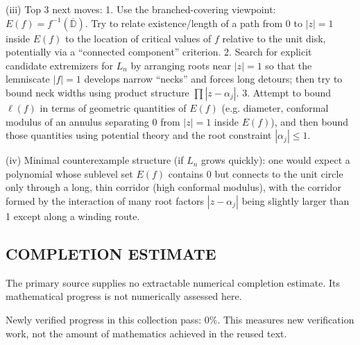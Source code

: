 (iii) Top 3 next moves:
1. Use the branched-covering viewpoint: \(E(f)=f^{-1}(\overline{\mathbb{D}})\). Try to relate existence/length of a path from \(0\) to \(|z|=1\) inside \(E(f)\) to the location of critical values of \(f\) relative to the unit disk, potentially via a ``connected component'' criterion.
2. Search for explicit candidate extremizers for \(L_n\) by arranging roots near \(|z|=1\) so that the lemniscate \(|f|=1\) develops narrow ``necks'' and forces long detours; then try to bound neck widths using product structure \(\prod|z-\alpha_j|\).
3. Attempt to bound \(\ell(f)\) in terms of geometric quantities of \(E(f)\) (e.g. diameter, conformal modulus of an annulus separating \(0\) from \(|z|=1\) inside \(E(f)\)), and then bound those quantities using potential theory and the root constraint \(|\alpha_j|\le 1\).

(iv) Minimal counterexample structure (if \(L_n\) grows quickly): one would expect a polynomial whose sublevel set \(E(f)\) contains \(0\) but connects to the unit circle only through a long, thin corridor (high conformal modulus), with the corridor formed by the interaction of many root factors \(|z-\alpha_j|\) being slightly larger than 1 except along a winding route.


\subsection*{COMPLETION ESTIMATE}
The primary source supplies no extractable numerical completion estimate. Its mathematical progress is not numerically assessed here.

Newly verified progress in this collection pass: $0\%$. This measures new verification work, not the amount of mathematics achieved in the reused text.
